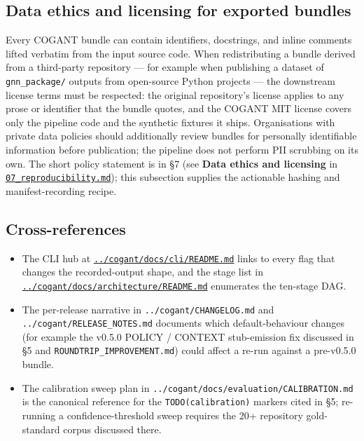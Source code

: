 \documentclass[
]{article}
\providecommand{\tightlist}{%
  \setlength{\itemsep}{0pt}\setlength{\parskip}{0pt}}
\begin{document}
\subsection{Data ethics and licensing for exported
bundles}\label{data-ethics-and-licensing-for-exported-bundles}

Every COGANT bundle can contain identifiers, docstrings, and inline
comments lifted verbatim from the input source code. When redistributing
a bundle derived from a third-party repository --- for example when
publishing a dataset of \texttt{gnn\_package/} outputs from open-source
Python projects --- the downstream license terms must be respected: the
original repository's license applies to any prose or identifier that
the bundle quotes, and the COGANT MIT license covers only the pipeline
code and the synthetic fixtures it ships. Organisations with private
data policies should additionally review bundles for personally
identifiable information before publication; the pipeline does not
perform PII scrubbing on its own. The short policy statement is in §7
(see \textbf{Data ethics and licensing} in
\href{07_reproducibility.md}{\texttt{07\_reproducibility.md}}); this
subsection supplies the actionable hashing and manifest-recording
recipe.

\subsection{Cross-references}\label{cross-references}

\begin{itemize}
\tightlist
\item
  The CLI hub at
  \href{../cogant/docs/cli/README.md}{\texttt{../cogant/docs/cli/README.md}}
  links to every flag that changes the recorded-output shape, and the
  stage list in
  \href{../cogant/docs/architecture/README.md}{\texttt{../cogant/docs/architecture/README.md}}
  enumerates the ten-stage DAG.
\item
  The per-release narrative in \texttt{../cogant/CHANGELOG.md} and
  \texttt{../cogant/RELEASE\_NOTES.md} documents which default-behaviour
  changes (for example the v0.5.0 POLICY / CONTEXT stub-emission fix
  discussed in §5 and \texttt{ROUNDTRIP\_IMPROVEMENT.md}) could affect a
  re-run against a pre-v0.5.0 bundle.
\item
  The calibration sweep plan in
  \texttt{../cogant/docs/evaluation/CALIBRATION.md} is the canonical
  reference for the \texttt{TODO(calibration)} markers cited in §5;
  re-running a confidence-threshold sweep requires the 20+ repository
  gold-standard corpus discussed there.
\end{itemize}
\end{document}
